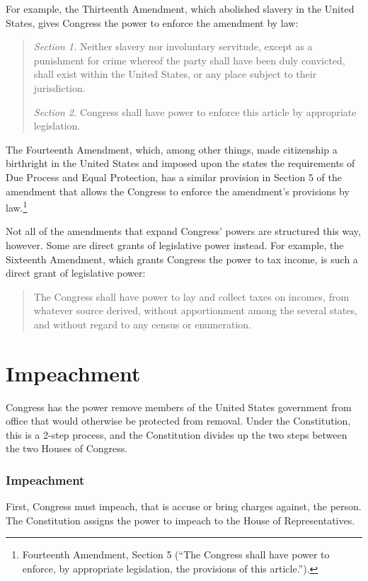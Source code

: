 For example, the Thirteenth Amendment, which abolished slavery in the United States, gives Congress the power to enforce the amendment by law:

\begin{quote}
\textit{Section 1.} Neither slavery nor involuntary servitude, except as a punishment for crime whereof the party shall have been duly convicted, shall exist within the United States, or any place subject to their jurisdiction.  

\textit{Section 2.} Congress shall have power to enforce this article by appropriate legislation.
\end{quote}

The Fourteenth Amendment, which, among other things, made citizenship a birthright in the United States and imposed upon the states the requirements of Due Process and Equal Protection, has a similar provision in Section 5 of the amendment that allows the Congress to enforce the amendment's provisions by law.\footnote{Fourteenth Amendment, Section 5 (``The Congress shall have power to enforce, by appropriate legislation, the provisions of this article.'').}

Not all of the amendments that expand Congress' powers are structured this way, however.  Some are direct grants of legislative power instead.  For example, the Sixteenth Amendment, which grants Congress the power to tax income, is such a direct grant of legislative power:

\begin{quote}
The Congress shall have power to lay and collect taxes on incomes, from whatever source derived, without apportionment among the several states, and without regard to any census or enumeration.
\end{quote}

\section{Impeachment}
Congress has the power remove members of the United States government from office that would otherwise be protected from removal.
Under the Constitution, this is a 2-step process, and the Constitution divides up the two steps between the two Houses of Congress.

\subsubsection{Impeachment}

First, Congress must impeach, that is accuse or bring charges against, the person.  The Constitution assigns the power to impeach to the House of Representatives.

